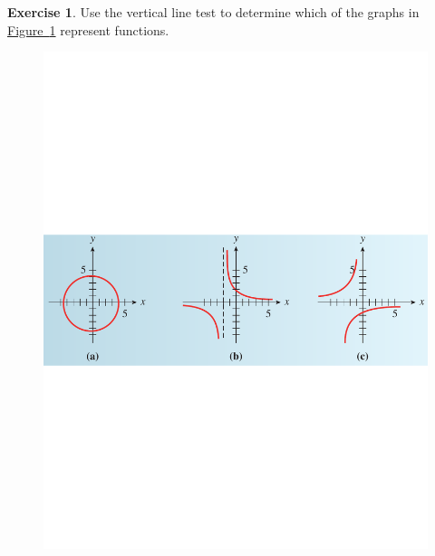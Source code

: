 \documentclass[10pt,]{book}
\theoremstyle{plain}
\theoremstyle{definition}
\theoremstyle{definition}
\theoremstyle{definition}
\theoremstyle{definition}
\newtheorem{exercise}[theorem]{Exercise}
\numberwithin{equation}{part}
\begin{document}
\begin{exercise}\label{example-vertical-line-test3}
Use the vertical line test to determine which of the graphs in \hyperref[fig-vertical-line-test3]{Figure~\ref{fig-vertical-line-test3}} represent functions. \begin{figure}
\centering
\includegraphics[width=1\linewidth]{images/fig-vertical-line-test3}
\caption{\label{fig-vertical-line-test3}}
\end{figure}
\end{exercise}
\typeout{************************************************}
\typeout{************************************************}
\end{document}
